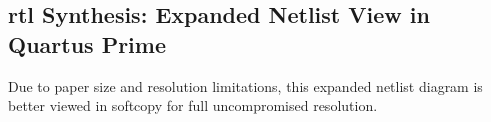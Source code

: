 \begin{appendices}
	\section{\ac{rtl} Synthesis: Expanded Netlist View in Quartus Prime}\label{app:rtl}
	Due to paper size and resolution limitations, this expanded netlist diagram is better viewed in softcopy for full uncompromised resolution.

	\begin{minipage}[t][][b]{\linewidth}
		
	\end{minipage}
\end{appendices}